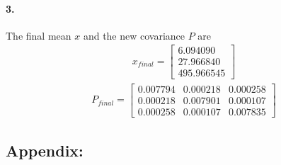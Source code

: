 \documentclass[a4paper]{article}
\begin{document}
\paragraph{3. } The final mean $x$ and the new covariance $P$ are
\begin{align*}
x_{final} = 
	\begin{bmatrix}
		6.094090   \\   27.966840  \\   495.966545
	\end{bmatrix}
\end{align*}
\begin{align*}
P_{final} = 
	\begin{bmatrix}
        0.007794   &    0.000218   &    0.000258\\
        0.000218   &    0.007901   &    0.000107\\
        0.000258   &    0.000107   &    0.007835
	\end{bmatrix}
\end{align*}

\newpage
\subsection*{Appendix:}



\end{document}
